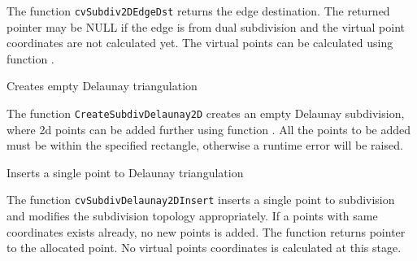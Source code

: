 \begin{description}
\end{description}

The function \texttt{cvSubdiv2DEdgeDst} returns the edge destination. The
returned pointer may be NULL if the edge is from dual subdivision and
the virtual point coordinates are not calculated yet. The virtual points
can be calculated using function .

\label{CreateSubdivDelaunay2D}

Creates empty Delaunay triangulation


\begin{description}
\end{description}

The function \texttt{CreateSubdivDelaunay2D} creates an empty Delaunay
subdivision, where 2d points can be added further using function
. All the points to be added must be within
the specified rectangle, otherwise a runtime error will be raised.

\label{SubdivDelaunay2DInsert}

Inserts a single point to Delaunay triangulation


\begin{description}
\end{description}

The function \texttt{cvSubdivDelaunay2DInsert} inserts a single point to subdivision and modifies the subdivision topology appropriately. If a points with same coordinates exists already, no new points is added. The function returns pointer to the allocated point. No virtual points coordinates is calculated at this stage.

